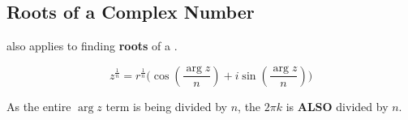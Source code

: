 \subsection{Roots of a Complex Number}\label{subsec:Complex_Roots}
 also applies to finding \textbf{roots} of a .

\begin{equation}\label{eq:Complex_Roots}
  z^{\frac{1}{n}} = r^{\frac{1}{n}} \biggl( \cos \left( \frac{\arg{z}}{n} \right) + i \sin \left( \frac{\arg{z}}{n} \right) \biggr)
\end{equation}

\begin{remark*}
  As the entire $\arg{z}$ term is being divided by $n$, the $2 \pi k$ is \textbf{ALSO} divided by $n$.
\end{remark*}


